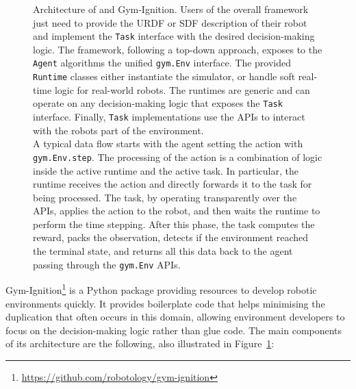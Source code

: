 \begin{figure}
    \centering
    \caption{Architecture of \scenario and Gym-Ignition. Users of the overall framework just need to provide the \acs{URDF} or \acs{SDF} description of their robot and implement the \texttt{Task} interface with the desired decision-making logic. The framework, following a top-down approach, exposes to the \texttt{Agent} algorithms the unified \texttt{gym.Env} interface. The provided \texttt{Runtime} classes either instantiate the simulator, or handle soft real-time logic for real-world robots. The runtimes are generic and can operate on any decision-making logic that exposes the \texttt{Task} interface. Finally, \texttt{Task} implementations use the \scenario \acsp{API} to interact with the robots part of the environment.\\
    A typical data flow starts with the agent setting the action with \texttt{gym.Env.step}. The processing of the action is a combination of logic inside the active runtime and the active task. In particular, the runtime receives the action and directly forwards it to the task for being processed. The task, by operating transparently over the \scenario \acsp{API}, applies the action to the robot, and then waits the runtime to perform the time stepping. After this phase, the task computes the reward, packs the observation, detects if the environment reached the terminal state, and returns all this data back to the agent passing through the \texttt{gym.Env} \acsp{API}.}
    \label{fig:scenario_and_gym_ignition}
\end{figure}

Gym-Ignition\footnote{\url{https://github.com/robotology/gym-ignition}} is a Python package providing resources to develop robotic environments quickly.
It provides boilerplate code that helps minimising the duplication that often occurs in this domain, allowing environment developers to focus on the decision-making logic rather than glue code.
The main components of its architecture are the following, also illustrated in Figure~\ref{fig:scenario_and_gym_ignition}: 

